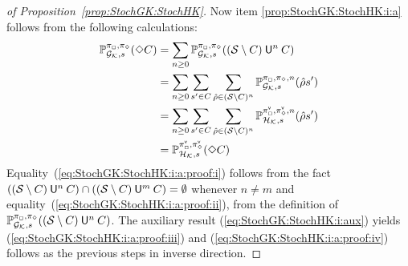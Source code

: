 \begin{proof}[of Proposition~\ref{prop:StochGK:StochHK}]
  Now item \ref{prop:StochGK:StochHK:i:a} follows from the following
  calculations:
  \begin{align}
    \mathbb{P}^{\pi_{{\Box}},\pi_{{\Diamond}}}_{{\mathcal{G}_{\mathcal{K}}},s}(\Diamond C)
    & =
    \sum_{n\geq0}\mathbb{P}^{\pi_{{\Box}},\pi_{{\Diamond}}}_{{\mathcal{G}_{\mathcal{K}}},s}((\mathcal{S}\setminus C) \mathbin{\mathsf{U}}^n C)
    \label{eq:StochGK:StochHK:i:a:proof:i}\\
    & =
    \sum_{n\geq0}\sum_{s'\in C}\sum_{\hat{\rho}\in (\mathcal{S}\setminus C)^n}\mathbb{P}^{\pi_{{\Box}},\pi_{{\Diamond}},n}_{{\mathcal{G}_{\mathcal{K}}},s}(\hat{\rho}s')
    \label{eq:StochGK:StochHK:i:a:proof:ii}\\
    & =
    \sum_{n\geq0}\sum_{s'\in C}\sum_{\hat{\rho}\in (\mathcal{S}\setminus C)^n}\mathbb{P}^{{\pi}^{\mathsf{v}}_{{\Box}},{\pi}^{\mathsf{v}}_{{\Diamond}},n}_{{\mathcal{H}_{\mathcal{K}}},s}(\hat{\rho}s')
    \label{eq:StochGK:StochHK:i:a:proof:iii}\\
    & =
    \mathbb{P}^{{\pi}^{\mathsf{v}}_{{\Box}},{\pi}^{\mathsf{v}}_{{\Diamond}}}_{{\mathcal{H}_{\mathcal{K}}},s}(\Diamond C)
    \label{eq:StochGK:StochHK:i:a:proof:iv}
  \end{align}
  Equality~(\ref{eq:StochGK:StochHK:i:a:proof:i}) follows from the fact
  $((\mathcal{S}\setminus C) \mathbin{\mathsf{U}}^n C) \cap ((\mathcal{S}\setminus C) \mathbin{\mathsf{U}}^m C) = \emptyset$
  whenever $n\neq m$ and
  equality~(\ref{eq:StochGK:StochHK:i:a:proof:ii}), from the definition
  of
  $\mathbb{P}^{\pi_{{\Box}},\pi_{{\Diamond}}}_{{\mathcal{G}_{\mathcal{K}}},s}((\mathcal{S}\setminus C) \mathbin{\mathsf{U}}^n C)$.
  The auxiliary result (\ref{eq:StochGK:StochHK:i:aux}) yields
  (\ref{eq:StochGK:StochHK:i:a:proof:iii}) and
  (\ref{eq:StochGK:StochHK:i:a:proof:iv}) follows as the previous steps
  in inverse direction.



\end{proof}
